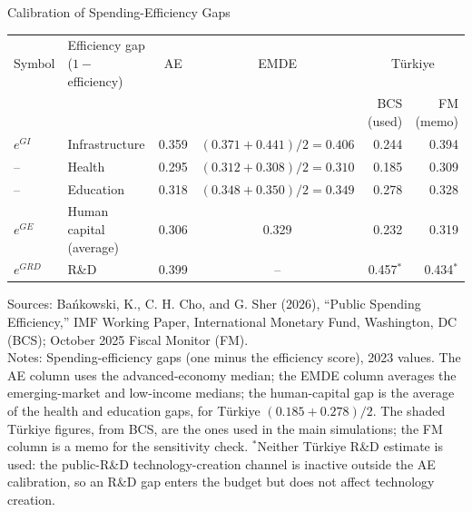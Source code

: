 \documentclass[aspectratio=169, 11pt, t]{beamer}
\begin{document}
\begin{frame}{Calibration of Spending-Efficiency Gaps}\label{slide:calib}
    \vspace{0.2em}
    \begin{center}
    \scriptsize
    \renewcommand{\arraystretch}{1.2}
    \setlength{\tabcolsep}{5pt}   %
    \begin{tabular}{llccrr}
        \toprule
        Symbol & Efficiency gap ($1-$ efficiency) & AE & EMDE & \multicolumn{2}{c}{Türkiye} \\
        \cmidrule(lr){5-6}
         & & & & BCS (used) & FM (memo) \\
        \midrule
        $e^{GI}$ & Infrastructure & 0.359 & $(0.371+0.441)/2 = 0.406$ & \cellcolor{gray!20}0.244 & 0.394 \\
        \addlinespace[0.3em]
        -- & \quad Health & 0.295 & $(0.312+0.308)/2 = 0.310$ & 0.185 & 0.309 \\
        -- & \quad Education & 0.318 & $(0.348+0.350)/2 = 0.349$ & 0.278 & 0.328 \\
        \addlinespace[0.3em]
        $e^{GE}$ & Human capital (average) & 0.306 & 0.329 & \cellcolor{gray!20}0.232 & 0.319 \\
        \addlinespace[0.3em]
        $e^{GRD}$ & R\&D & 0.399 & -- & 0.457$^{*}$ & 0.434$^{*}$ \\
        \bottomrule
    \end{tabular}
    \end{center}

    \vspace{0.6em}
    {\fontsize{6pt}{7.5pt}\selectfont
        Sources: Bańkowski, K., C. H. Cho, and G. Sher (2026), ``Public Spending Efficiency,'' IMF Working Paper, International Monetary Fund, Washington, DC (BCS); October 2025 Fiscal Monitor (FM). \\
        Notes: Spending-efficiency gaps (one minus the efficiency score), 2023 values. The AE column uses the advanced-economy median; the EMDE column averages the emerging-market and low-income medians; the human-capital gap is the average of the health and education gaps, for Türkiye $(0.185+0.278)/2$. The shaded Türkiye figures, from BCS, are the ones used in the main simulations; the FM column is a memo for the sensitivity check. $^{*}$Neither Türkiye R\&D estimate is used: the public-R\&D technology-creation channel is inactive outside the AE calibration, so an R\&D gap enters the budget but does not affect technology creation. \\
    }
\end{frame}
\end{document}
